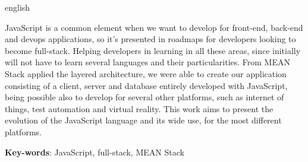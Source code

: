 \documentclass[
	12pt,				%
	openright,			%
	twoside,			%
	a4paper,			%
	english,			%
	brazil				%
	]{abntex2}
\begin{document}
\begin{resumo}[Abstract]
 \begin{otherlanguage*}{english}
 
JavaScript is a common element when we want to develop for front-end, back-end and devops applications, so it's presented in roadmaps for developers looking to become full-stack. Helping developers in learning in all these areas, since initially will not have to learn several languages and their particularities. From MEAN Stack applied the layered architecture, we were able to create our application consisting of a client, server and database entirely developed with JavaScript, being possible also to develop for several other platforms, such as internet of things, test automation and virtual reality. This work aims to present the evolution of the JavaScript language and its wide use, for the most different platforms.



   \vspace{\onelineskip}
 
   \noindent 
   \textbf{Key-words}: JavaScript, full-stack, MEAN Stack
 \end{otherlanguage*}
\end{resumo}
\listoffigures*
\cleardoublepage

\end{document}
